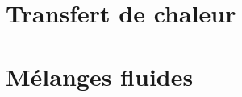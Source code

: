 \documentclass[10pt,a4paper,twocolumn,fleqn]{article}
\begin{document}
\section{Transfert de chaleur}


\section{Mélanges fluides} %


\nocite{*}


\end{document}
